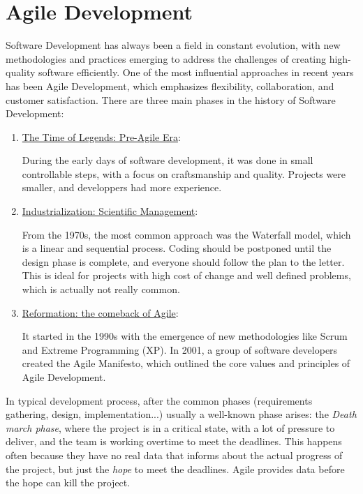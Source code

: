 \chapter{Agile Development}

Software Development has always been a field in constant evolution, with new methodologies and practices emerging to address the challenges of creating high-quality software efficiently. One of the most influential approaches in recent years has been Agile Development, which emphasizes flexibility, collaboration, and customer satisfaction.
There are three main phases in the history of Software Development:
\begin{enumerate}
    \item \ul{The Time of Legends: Pre-Agile Era}:
    
    During the early days of software development, it was done in small controllable steps, with a focus on craftsmanship and quality. Projects were smaller, and developpers had more experience.
    \item \ul{Industrialization: Scientific Management}:
    
    From the 1970s, the most common approach was the Waterfall model, which is a linear and sequential process. Coding should be postponed until the design phase is complete, and everyone should follow the plan to the letter. This is ideal for projects with high cost of change and well defined problems, which is actually not really common.
    \item \ul{Reformation: the comeback of Agile}:
    
    It started in the 1990s with the emergence of new methodologies like Scrum and Extreme Programming (XP). In 2001, a group of software developers created the Agile Manifesto, which outlined the core values and principles of Agile Development.
\end{enumerate}


In typical development process, after the common phases (requirements gathering, design, implementation...) usually a well-known phase arises: the \emph{Death march phase}, where the project is in a critical state, with a lot of pressure to deliver, and the team is working overtime to meet the deadlines. This happens often because they have no real data that informs about the actual progress of the project, but just the \emph{hope} to meet the deadlines. Agile provides data before the hope can kill the project.\\

